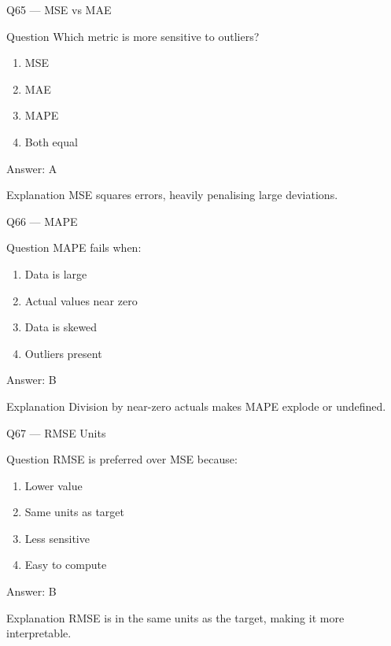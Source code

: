 \documentclass[aspectratio=169,8pt]{beamer}
\begin{document}
	\begin{frame}{Q65 --- MSE vs MAE}
		\begin{block}{Question}
			Which metric is more sensitive to outliers?
		\end{block}
		\begin{enumerate}
			\item MSE
			\item MAE
			\item MAPE
			\item Both equal
		\end{enumerate}
		\begin{exampleblock}{Answer: A}\end{exampleblock}
		\begin{block}{Explanation}
			MSE squares errors, heavily penalising large deviations.
		\end{block}
	\end{frame}
	
	\begin{frame}{Q66 --- MAPE}
		\begin{block}{Question}
			MAPE fails when:
		\end{block}
		\begin{enumerate}
			\item Data is large
			\item Actual values near zero
			\item Data is skewed
			\item Outliers present
		\end{enumerate}
		\begin{exampleblock}{Answer: B}\end{exampleblock}
		\begin{block}{Explanation}
			Division by near-zero actuals makes MAPE explode or undefined.
		\end{block}
	\end{frame}
	
	\begin{frame}{Q67 --- RMSE Units}
		\begin{block}{Question}
			RMSE is preferred over MSE because:
		\end{block}
		\begin{enumerate}
			\item Lower value
			\item Same units as target
			\item Less sensitive
			\item Easy to compute
		\end{enumerate}
		\begin{exampleblock}{Answer: B}\end{exampleblock}
		\begin{block}{Explanation}
			RMSE is in the same units as the target, making it more interpretable.
		\end{block}
	\end{frame}
	
\end{document}
